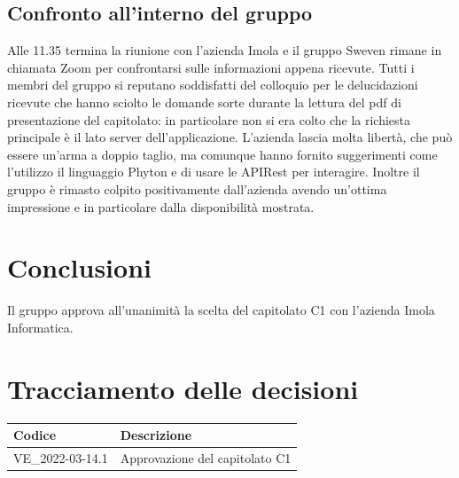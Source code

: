 \documentclass[12pt, a4paper,table]{article}
\begin{document}
		\subsection{Confronto all'interno del gruppo}
		Alle 11.35 termina la riunione con l'azienda Imola e il gruppo Sweven rimane in chiamata Zoom
		per confrontarsi sulle informazioni appena ricevute. \newline
		Tutti i membri del gruppo si reputano soddisfatti del colloquio per le delucidazioni ricevute 
		che hanno sciolto le domande sorte durante la lettura del pdf di presentazione del capitolato:
		in particolare non si era colto che la richiesta principale è il lato server dell'applicazione.
		L'azienda lascia molta libertà, che può essere un'arma a doppio taglio, ma comunque hanno 
		fornito suggerimenti come l'utilizzo il linguaggio Phyton e di usare le APIRest per interagire.
		Inoltre il gruppo è rimasto colpito positivamente dall'azienda avendo un'ottima impressione e
		in particolare dalla disponibilità mostrata.
	
	\section{Conclusioni}
	Il gruppo approva all'unanimità la scelta del capitolato C1 con l'azienda Imola Informatica.
	\newpage
	
	\section*{Tracciamento delle decisioni}
	\renewcommand{\arraystretch}{2} %
	\begin{tabular}{ |m{8em}|m{30em}| }
		\hline
		\textbf{Codice} & \textbf{Descrizione} \\
		\hline
		VE\_2022-03-14.1 & Approvazione del capitolato C1 \\
		\hline
	\end{tabular}
\end{document}
